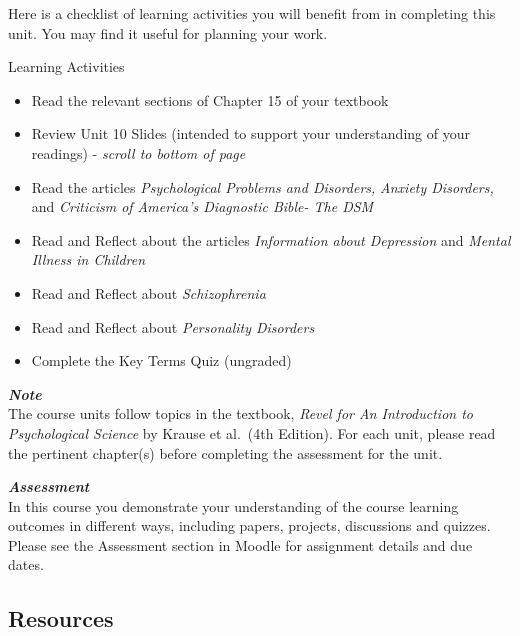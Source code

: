 \documentclass[
]{book}
\providecommand{\tightlist}{%
  \setlength{\itemsep}{0pt}\setlength{\parskip}{0pt}}
\begin{document}
Here is a checklist of learning activities you will benefit from in completing this unit. You may find it useful for planning your work.

\begin{reflect}
{Learning Activities}

\begin{itemize}
\tightlist
\item
  Read the relevant sections of Chapter 15 of your textbook
\item
  Review Unit 10 Slides (intended to support your understanding of your readings) - \emph{scroll to bottom of page}
\item
  Read the articles \emph{Psychological Problems and Disorders,} \emph{Anxiety Disorders,} and \emph{Criticism of America's Diagnostic Bible- The DSM}
\item
  Read and Reflect about the articles \emph{Information about Depression} and \emph{Mental Illness in Children}
\item
  Read and Reflect about \emph{Schizophrenia}
\item
  Read and Reflect about \emph{Personality Disorders}
\item
  Complete the Key Terms Quiz (ungraded)
\end{itemize}
\end{reflect}

\begin{caution}
\textbf{\emph{Note}}\\
The course units follow topics in the textbook, \emph{Revel for An Introduction to Psychological Science} by Krause et al.~(4th Edition). For each unit, please read the pertinent chapter(s) before completing the assessment for the unit.
\end{caution}

\begin{assessment}
\textbf{\emph{Assessment}}\\
In this course you demonstrate your understanding of the course learning outcomes in different ways, including papers, projects, discussions and quizzes. Please see the Assessment section in Moodle for assignment details and due dates.
\end{assessment}

\hypertarget{resources-9}{%
\subsection*{Resources}\label{resources-9}}
\end{document}
